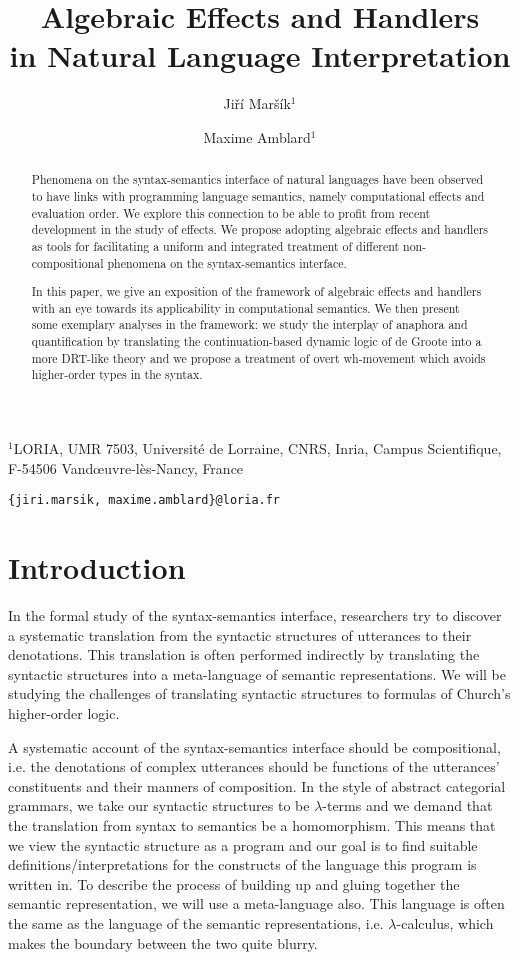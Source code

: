 \documentclass{article}
\title{Algebraic Effects and Handlers \\ in Natural Language Interpretation}
\author{Jiří Maršík$^1$ \and Maxime Amblard$^1$}
\date{}
\begin{document}
\maketitle

\begin{center}
$^1$LORIA, UMR 7503, Université de Lorraine, CNRS, Inria, Campus Scientifique, \\
F-54506 Vand\oe uvre-lès-Nancy, France

\texttt{\{jiri.marsik, maxime.amblard\}@loria.fr}
\end{center}

\begin{abstract}
  Phenomena on the syntax-semantics interface of natural languages have been
  observed to have links with programming language semantics, namely
  computational effects and evaluation order. We explore this connection to be
  able to profit from recent development in the study of effects. We propose
  adopting algebraic effects and handlers as tools for facilitating a uniform
  and integrated treatment of different non-compositional phenomena on the
  syntax-semantics interface.

  In this paper, we give an exposition of the framework of algebraic effects
  and handlers with an eye towards its applicability in computational
  semantics. We then present some exemplary analyses in the framework: we
  study the interplay of anaphora and quantification by translating the
  continuation-based dynamic logic of de Groote into a more DRT-like theory
  and we propose a treatment of overt wh-movement which avoids higher-order
  types in the syntax.
\end{abstract}

\section{Introduction}
\label{sec:motivation}

In the formal study of the syntax-semantics interface, researchers try to
discover a systematic translation from the syntactic structures of utterances
to their denotations. This translation is often performed indirectly by
translating the syntactic structures into a meta-language of semantic
representations. We will be studying the challenges of translating syntactic
structures to formulas of Church's higher-order logic.

A systematic account of the syntax-semantics interface should be
compositional, i.e. the denotations of complex utterances should be functions
of the utterances' constituents and their manners of composition. In the style
of abstract categorial grammars, we take our syntactic structures to be
$\lambda$-terms and we demand that the translation from syntax to semantics be
a homomorphism. This means that we view the syntactic structure as a program
and our goal is to find suitable definitions/interpretations for the
constructs of the language this program is written in. To describe the process
of building up and gluing together the semantic representation, we will use a
meta-language also. This language is often the same as the language of the
semantic representations, i.e. $\lambda$-calculus, which makes the boundary
between the two quite blurry.
\end{document}
